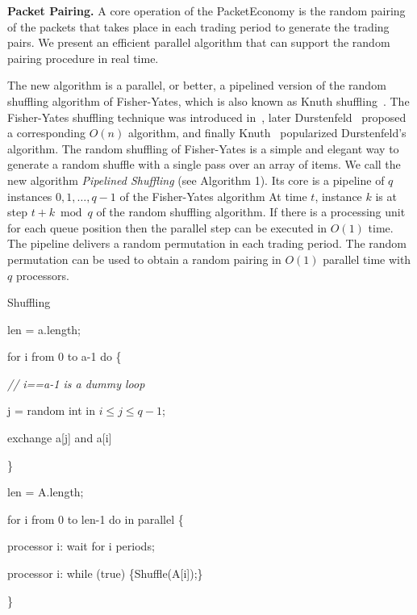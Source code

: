 \documentclass[letterpaper,10pt]{llncs}
\newenvironment{localscope}{}{}
\newcommand{\cw}[1]{}
\begin{document}
\noindent
{\bf Packet Pairing.}
A core operation of the PacketEconomy is the random pairing of the packets 
that takes place in each trading period to generate the trading pairs.
We present an efficient parallel algorithm that can support the random pairing 
procedure in real time. 

The new algorithm is a parallel, or better, a pipelined version of 
the random shuffling algorithm of 
Fisher-Yates, which is also known as Knuth shuffling~\cite{wiki:2011:shuffling,Knuth:1981:Vol2}.
The Fisher-Yates shuffling technique was introduced in~\cite{Fisher:1948:Shuffle},
later Durstenfeld~\cite{Durstenfeld:1964:Shuffle} proposed a corresponding
$O(n)$ algorithm, and finally Knuth~\cite{Knuth:1981:Vol2} popularized
Durstenfeld's algorithm.
The random shuffling of Fisher-Yates is a simple and elegant way to generate
a random shuffle with a single pass over an array of items.
We call the new algorithm \emph{Pipelined Shuffling} (see Algorithm 1). Its core
is a pipeline of $q$ instances $0,1,\dots,q-1$ of the Fisher-Yates algorithm 
At time $t$, instance $k$ is at step $t+k \bmod q$ of the random shuffling algorithm.
If there is a processing unit for each queue position then the parallel step
can be executed in $O(1)$ time. The pipeline delivers a random permutation
in each trading period. The random permutation can be used to obtain a 
random pairing in $O(1)$ parallel time with $q$ processors.

\begin{localscope}
\begin{algorithm}
\caption{Shuffling}
\label{alg:shuffle}
\begin{algorithmic}[1]
\cw{2cm}

len = a.length;

for i from 0 to a-1 do \{ 

\hspace{0,5cm} \textit{// i==a-1 is a dummy loop}

\hspace{0,5cm}      j = random int in $i \leq j \leq q-1$; 

\hspace{0,5cm}       exchange a[j] and a[i]

\} 

\EndProcedure

\end{algorithmic}

\begin{algorithmic}[1]
\cw{2cm}

len = A.length;

for i from 0 to len-1 do in parallel \{ 

\hspace{0,5cm}      processor i: wait for i periods;

\hspace{0,5cm}      processor i: while (true) \{Shuffle(A[i]);\} 

\}
\EndProcedure
\end{algorithmic}
\end{algorithm}
\end{localscope}
\end{document}
